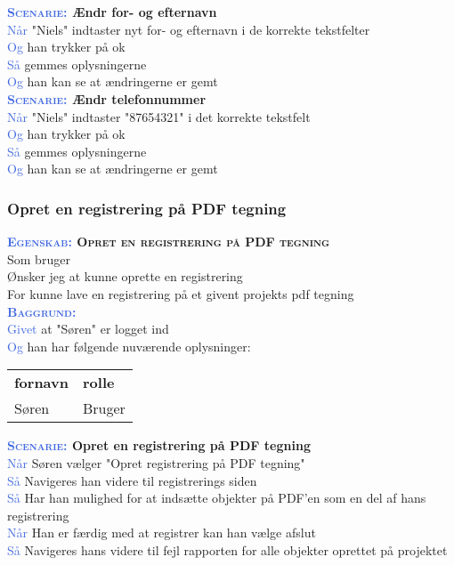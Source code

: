 \textbf{\textsc{\textcolor{RoyalBlue}{Scenarie:}} Ændr for- og efternavn}\\
\textcolor{RoyalBlue}{Når} "Niels" indtaster nyt for- og efternavn i de korrekte tekstfelter\\
\textcolor{RoyalBlue}{Og} han trykker på ok\\
\textcolor{RoyalBlue}{Så} gemmes oplysningerne\\
\textcolor{RoyalBlue}{Og} han kan se at ændringerne er gemt\\

\textbf{\textsc{\textcolor{RoyalBlue}{Scenarie:}} Ændr telefonnummer}\\
\textcolor{RoyalBlue}{Når} "Niels" indtaster "87654321" i det korrekte tekstfelt\\
\textcolor{RoyalBlue}{Og} han trykker på ok\\
\textcolor{RoyalBlue}{Så} gemmes oplysningerne\\
\textcolor{RoyalBlue}{Og} han kan se at ændringerne er gemt\\

\subsubsection{Opret en registrering på PDF tegning} %
\textbf{\textsc{\textcolor{RoyalBlue}{Egenskab:} Opret en registrering på PDF tegning}}\\
Som bruger\\
Ønsker jeg at kunne oprette en registrering\\
For kunne lave en registrering på et givent projekts pdf tegning\\

\textsc{\textcolor{RoyalBlue}{\textbf{Baggrund:}}}\\
\textcolor{RoyalBlue}{Givet} at "Søren" er logget ind\\
\textcolor{RoyalBlue}{Og} han har følgende nuværende oplysninger:\\
\begin{tabular}{| l | l |}
	\textbf{fornavn} & \textbf{rolle} \\
	Søren & Bruger\\
\end{tabular}

\textbf{\textsc{\textcolor{RoyalBlue}{Scenarie:}} Opret en registrering på PDF tegning}\\
\textcolor{RoyalBlue}{Når} Søren vælger "Opret registrering på PDF tegning"\\
\textcolor{RoyalBlue}{Så}  Navigeres han videre til registrerings siden\\
\textcolor{RoyalBlue}{Så}  Har han mulighed for at indsætte objekter på PDF'en som en del af hans registrering\\
\textcolor{RoyalBlue}{Når} Han er færdig med at registrer kan han vælge afslut \\
\textcolor{RoyalBlue}{Så}  Navigeres hans videre til fejl rapporten for alle objekter oprettet på projektet \\ 


